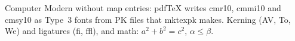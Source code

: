 \documentclass{article}
\begin{document}
Computer Modern without map entries: pdfTeX writes cmr10, cmmi10 and cmsy10
as Type~3 fonts from PK files that mktexpk makes. Kerning (AV, To, We) and
ligatures (fi, ffl), and math: $a^2+b^2=c^2$, $\alpha\le\beta$.
\end{document}
